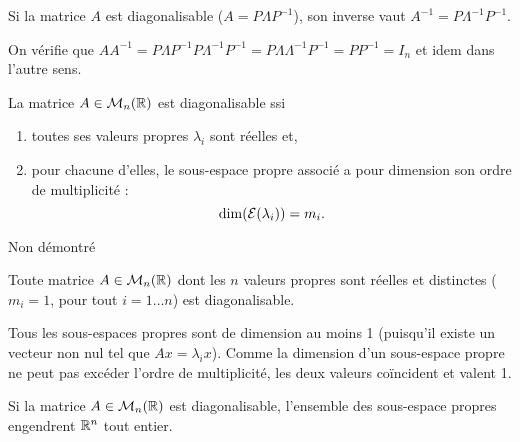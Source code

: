 

\begin{proposition}
  Si la matrice $A$ est diagonalisable ($A = P \Lambda P^{-1}$), son inverse vaut $A^{-1} = P \Lambda^{-1} P^{-1}$.
\end{proposition}

\proof
On vérifie que $A A^{-1} = P \Lambda P^{-1} P \Lambda^{-1} P^{-1} = P \Lambda \Lambda^{-1} P^{-1} = P P^{-1} = I_n$ et idem dans l'autre sens.
\eproof

\begin{theorem}
  La matrice $A \in \mathcal{M}_n(\mathbb{R})$ est diagonalisable ssi 
  \begin{enumerate}
   \item toutes ses valeurs propres $\lambda_i$ sont réelles et, 
   \item pour chacune d'elles, le sous-espace propre associé a pour dimension son ordre de multiplicité : 
   $$
   \dim(\mathcal{E}(\lambda_i)) = m_i.
   $$
  \end{enumerate}
\end{theorem}

\proof
Non démontré
\eproof

\begin{corollary*}
  Toute matrice $A \in \mathcal{M}_n(\mathbb{R})$ dont les $n$ valeurs propres sont réelles et distinctes ($m_i = 1$, pour tout $i = 1 \dots n$) est diagonalisable.
\end{corollary*}

\proof
Tous les sous-espaces propres sont de dimension au moins 1 (puisqu'il existe un vecteur non nul tel que $Ax = \lambda_i x$). Comme la dimension d'un sous-espace propre ne peut pas excéder l'ordre de multiplicité, les deux valeurs coïncident et valent 1.
\eproof

\begin{corollary*}
  Si la matrice $A \in \mathcal{M}_n(\mathbb{R})$ est diagonalisable, l'ensemble des sous-espace propres engendrent $\mathbb{R}^n$ tout entier.
\end{corollary*}

